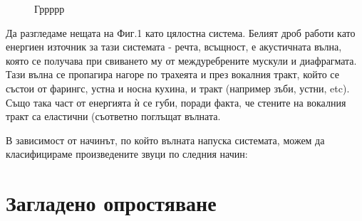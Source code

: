 \documentclass[12pt]{report}
\begin{document}
\begin{figure}[ht]
\begin{changemargin}{0cm}{0cm}
{                %
            }
        \end{changemargin} 

        \caption{Гррррр}%
        \label{fig:example}%
    \end{figure}
    
    Да разгледаме нещата на Фиг.1 като цялостна система.
    Белият дроб работи като енергиен източник за тази системата - речта, всъщност, е акустичната
    вълна, която се получава при свиването му от междуребрените мускули и диафрагмата.
    Тази вълна се пропагира нагоре по трахеята и през вокалния тракт, който се състои от фарингс, устна и носна кухина, и  
    тракт (например зъби, устни, etc). Също така част от енергията ѝ се губи, поради факта, че стените на вокалния тракт са еластични (съответно поглъщат вълната.

    В зависимост от начинът, по който вълната напуска системата, можем да класифицираме произведените звуци по следния начин:

    \section{Загладено опростяване}    
\end{document}
